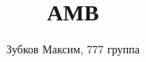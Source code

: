 \documentclass[a4paper,12pt]{article}
\title{АМВ}
\author{Зубков Максим, 777 группа}
\begin{document}
\maketitle

\newcommand{\lineann}[5][0.5]{%
    \begin{scope}[rotate=#2, #5,inner sep=2pt]
        \draw[dashed, #5!40] (0,0) -- +(0,#1)
            node [coordinate, near end] (a) {};                       
        \draw[dashed, #5!20] (#3,0) -- +(0,#1)
            node [coordinate, near end] (b) {};
        \draw[|<->|] (a) -- node[fill=white] {#4} (b);
    \end{scope}
        
}
\maketitle
			
\end{document}
